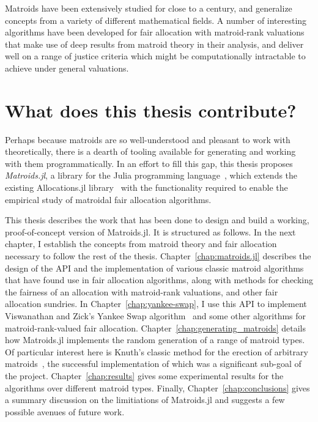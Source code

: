 Matroids have been extensively studied for close to a century, and generalize concepts from a variety of different mathematical fields. A number of interesting algorithms have been developed for fair allocation with matroid-rank valuations~\cite{barman2020fair,barman2021existence,Benabbou_2020,benabbou-2021,viswanathan2023yankee} that make use of deep results from matroid theory in their analysis, and deliver well on a range of justice criteria which might be computationally intractable to achieve under general valuations. 

\section*{What does this thesis contribute?}
Perhaps because matroids are so well-understood and pleasant to work with theoretically, there is a dearth of tooling available for generating and working with them programmatically. In an effort to fill this gap, this thesis proposes \textit{Matroids.jl}, a library for the Julia programming language~\cite{bezanson2017julia}, which extends the existing Allocations.jl library~\cite{Hetland_Allocations_jl_2022} with the functionality required to enable the empirical study of matroidal fair allocation algorithms. 

This thesis describes the work that has been done to design and build a working, proof-of-concept version of Matroids.jl. It is structured as follows. In the next chapter, I establish the concepts from matroid theory and fair allocation necessary to follow the rest of the thesis. Chapter~\ref{chap:matroids.jl} describes the design of the API and the implementation of various classic matroid algorithms that have found use in fair allocation algorithms, along with methods for checking the fairness of an allocation with matroid-rank valuations, and other fair allocation sundries. In Chapter~\ref{chap:yankee-swap}, I use this API to implement Viswanathan and Zick's Yankee Swap algorithm~\cite{viswanathan2023yankee} and some other algorithms for matroid-rank-valued fair allocation. Chapter~\ref{chap:generating_matroids} details how Matroids.jl implements the random generation of a range of matroid types. Of particular interest here is Knuth's classic method for the erection of arbitrary matroids~\cite{knuth-1975}, the successful implementation of which was a significant sub-goal of the project. Chapter~\ref{chap:results} gives some experimental results for the algorithms over different matroid types. Finally, Chapter~\ref{chap:conclusions} gives a summary discussion on the limitiations of Matroids.jl and suggests a few possible avenues of future work.




